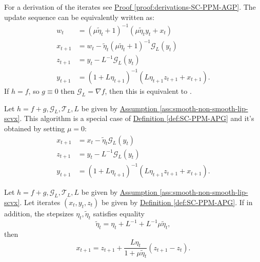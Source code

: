\documentclass[12pt]{article}
\begin{document}
        \begin{remark}
            For a derivation of the iterates see 
            \hyperref[proof:derivations-SC-PPM-AGP]
            {Proof \ref*{proof:derivations-SC-PPM-AGP}}. 
            The update sequence can be equivalently written as: 
            \begin{align*}
                w_{t} &= (\mu\tilde \eta_{t} + 1)^{-1}(\mu \tilde \eta_{t} y_t + x_t) 
                \\
                x_{t + 1}&= w_t - \tilde \eta_{t}(\mu\tilde \eta_{t} + 1)^{-1} \mathcal G_L(y_t)
                \\
                z_{t + 1}&= y_t - L^{-1}\mathcal G_L(y_t)
                \\
                y_{t + 1} &= (1 + L\eta_{t + 1})^{-1}(L\eta_{t + 1}z_{t + 1} + x_{t + 1}). 
            \end{align*}
            If $h = f$, so $g \equiv 0$ then $\mathcal G_L = \nabla f$, then this is equivalent to \cite[(6.24)]{ahn_understanding_2022}. 
        \end{remark}

        \begin{definition}\label{def:generic-apg}
            Let $h = f + g, \mathcal G_L, \mathcal T_L, L$ be given by 
            \hyperref[ass:smooth-non-smooth-lip-scvx]{Assumption \ref*{ass:smooth-non-smooth-lip-scvx}}.
            This algorithm is a special case of
            \hyperref[def:SC-PPM-APG]{Definition \ref*{def:SC-PPM-APG}}
            and it's obtained by setting $\mu = 0$: 
            \begin{align*}
                x_{t + 1} &= x_t - \tilde \eta_{t} \mathcal G_L (y_t)
                \\
                z_{t + 1} &= y_t - L^{-1}\mathcal G_L (y_t)
                \\
                y_{t + 1} &= (1 + L \eta_{t + 1})^{-1}(L\eta_{t + 1}z_{t + 1} + x_{t + 1}). 
            \end{align*}

        \end{definition}

        \begin{definition}\label{def:SC-similar-triangle}
            Let $h = f + g, \mathcal G_L, \mathcal T_L, L$ be given by 
            \hyperref[ass:smooth-non-smooth-lip-scvx]
            {Assumption \ref*{ass:smooth-non-smooth-lip-scvx}}. 
            Let iterates $(x_t, y_t, z_t)$ be given by 
            \hyperref[def:SC-PPM-APG]{Definition \ref*{def:SC-PPM-APG}}. 
            If in addition, the stepsizes $\eta_t, \tilde \eta_t$ satisfies equality 
            $$
                \tilde\eta_{t} = \eta_t + L^{-1} + L^{-1} \mu \tilde\eta_{t},
            $$
            then 
            $$
            x_{t + 1} = z_{t + 1} + 
            \frac{L\eta_t}{1 + \mu \tilde \eta_{t}} 
            (z_{t + 1} - z_t). 
            $$ 
        \end{definition}
\end{document}
